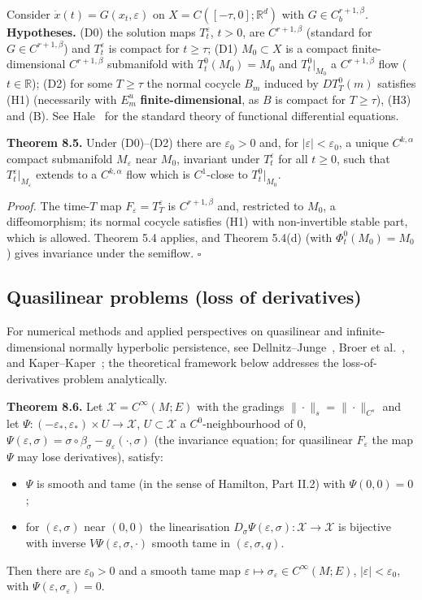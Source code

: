\documentclass[11pt,a4paper]{article}
\theoremstyle{plain}
\theoremstyle{definition}
\theoremstyle{remark}
\numberwithin{equation}{section}
\numberwithin{figure}{section}
\begin{document}
Consider $\dot x(t)=G(x_t,\varepsilon)$ on $X=C([-\tau,0];\mathbb R^d)$ with $G\in C^{r+1,\beta}_b$. \textbf{Hypotheses.} (D0) the solution maps $T^\varepsilon_t$, $t>0$, are $C^{r+1,\beta}$ (standard for $G\in C^{r+1,\beta}$) and $T^\varepsilon_t$ is compact for $t\ge\tau$; (D1) $M_0\subset X$ is a compact finite-dimensional $C^{r+1,\beta}$ submanifold with $T^0_t(M_0)=M_0$ and $T^0_t|_{M_0}$ a $C^{r+1,\beta}$ flow ($t\in\mathbb R$); (D2) for some $T\ge\tau$ the normal cocycle $B_m$ induced by $DT^0_T(m)$ satisfies (H1) (necessarily with $E^u_m$ \textbf{finite-dimensional}, as $B$ is compact for $T\ge\tau$), (H3) and (B). See Hale~\cite{hal77, Chap. III} for the standard theory of functional differential equations.

\textbf{Theorem 8.5.} Under (D0)–(D2) there are $\varepsilon_0>0$ and, for $|\varepsilon|<\varepsilon_0$, a unique $C^{k,\alpha}$ compact submanifold $M_\varepsilon$ near $M_0$, invariant under $T^\varepsilon_t$ for all $t\ge0$, such that $T_t^\varepsilon|_{M_\varepsilon}$ extends to a $C^{k,\alpha}$ flow which is $C^1$-close to $T^0_t|_{M_0}$.

\textit{Proof.} The time-$T$ map $F_\varepsilon=T^\varepsilon_T$ is $C^{r+1,\beta}$ and, restricted to $M_0$, a diffeomorphism; its normal cocycle satisfies (H1) with non-invertible stable part, which is allowed. Theorem 5.4 applies, and Theorem 5.4(d) (with $\Phi^0_t(M_0)=M_0$) gives invariance under the semiflow. $\square$

\subsection{Quasilinear problems (loss of derivatives)}

For numerical methods and applied perspectives on quasilinear and infinite-dimensional normally hyperbolic persistence, see Dellnitz–Junge~\cite{dell98}, Broer et al.~\cite{broe91}, and Kaper–Kaper~\cite{kape02}; the theoretical framework below addresses the loss-of-derivatives problem analytically.

\textbf{Theorem 8.6.} Let $\mathcal X=C^\infty(M;E)$ with the gradings $\|\cdot\|_s=\|\cdot\|_{C^s}$ and let $\Psi:(-\varepsilon_*,\varepsilon_*)\times U\to\mathcal X$, $U\subset\mathcal X$ a $C^0$-neighbourhood of $0$, $\Psi(\varepsilon,\sigma)=\sigma\circ\beta_\sigma-g_\varepsilon(\cdot,\sigma)$ (the invariance equation; for quasilinear $F_\varepsilon$ the map $\Psi$ may lose derivatives), satisfy:
\begin{itemize}
    \item[(Q1)] $\Psi$ is smooth and tame (in the sense of Hamilton, Part II.2) with $\Psi(0,0)=0$;
    \item[(Q2)] for $(\varepsilon,\sigma)$ near $(0,0)$ the linearisation $D_\sigma\Psi(\varepsilon,\sigma):\mathcal X\to\mathcal X$ is bijective with inverse $V\Psi(\varepsilon,\sigma,\cdot)$ smooth tame in $(\varepsilon,\sigma,q)$.
\end{itemize}
Then there are $\varepsilon_0>0$ and a smooth tame map $\varepsilon\mapsto\sigma_\varepsilon\in C^\infty(M;E)$, $|\varepsilon|<\varepsilon_0$, with $\Psi(\varepsilon,\sigma_\varepsilon)=0$.
\end{document}
